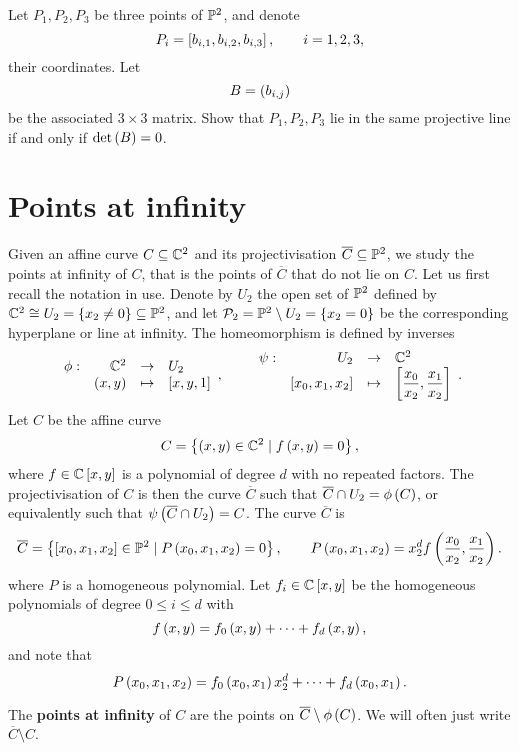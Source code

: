 \begin{exercise}
\label{ex:19}
Let $ P_1, P_2, P_3 $ be three points of $ \P^2 $, and denote
$$ P_i = \sb{b_{i, 1}, b_{i, 2}, b_{i, 3}}, \qquad i = 1, 2, 3, $$
their coordinates. Let
$$ B = \rb{b_{i, j}} $$
be the associated $ 3 \times 3 $ matrix. Show that $ P_1, P_2, P_3 $ lie in the same projective line if and only if $ \det\rb{B} = 0 $.
\end{exercise}

\pagebreak

\section{Points at infinity}

Given an affine curve $ C \subseteq \C^2 $ and its projectivisation $ \overline{C} \subseteq \P^2 $, we study the points at infinity of $ C $, that is the points of $ \overline{C} $ that do not lie on $ C $. Let us first recall the notation in use. Denote by $ U_2 $ the open set of $ \P^2 $ defined by $ \C^2 \cong U_2 = \cb{x_2 \ne 0} \subseteq \P^2 $, and let $ \PP_2 = \P^2 \setminus U_2 = \cb{x_2 = 0} $ be the corresponding hyperplane or line at infinity. The homeomorphism is defined by inverses
$$ \function[\phi]{\C^2}{U_2}{\rb{x, y}}{\sb{x, y, 1}}, \qquad \function[\psi]{U_2}{\C^2}{\sb{x_0, x_1, x_2}}{\sb{\dfrac{x_0}{x_2}, \dfrac{x_1}{x_2}}}. $$
Let $ C $ be the affine curve
$$ C = \cb{\rb{x, y} \in \C^2 \mid f\rb{x, y} = 0}, $$
where $ f \in \C\sb{x, y} $ is a polynomial of degree $ d $ with no repeated factors. The projectivisation of $ C $ is then the curve $ \overline{C} $ such that $ \overline{C} \cap U_2 = \phi\rb{C} $, or equivalently such that $ \psi\rb{\overline{C} \cap U_2} = C $. The curve $ \overline{C} $ is
$$ \overline{C} = \cb{\sb{x_0, x_1, x_2} \in \P^2 \mid P\rb{x_0, x_1, x_2} = 0}, \qquad P\rb{x_0, x_1, x_2} = x_2^df\rb{\dfrac{x_0}{x_2}, \dfrac{x_1}{x_2}}. $$
where $ P $ is a homogeneous polynomial. Let $ f_i \in \C\sb{x, y} $ be the homogeneous polynomials of degree $ 0 \le i \le d $ with
$$ f\rb{x, y} = f_0\rb{x, y} + \dots + f_d\rb{x, y}, $$
and note that
\begin{equation}
\label{eq:4}
P\rb{x_0, x_1, x_2} = f_0\rb{x_0, x_1}x_2^d + \dots + f_d\rb{x_0, x_1}.
\end{equation}

\begin{definition}
The \textbf{points at infinity} of $ C $ are the points on $ \overline{C} \setminus \phi\rb{C} $. We will often just write $ \overline{C} \setminus C $.
\end{definition}

